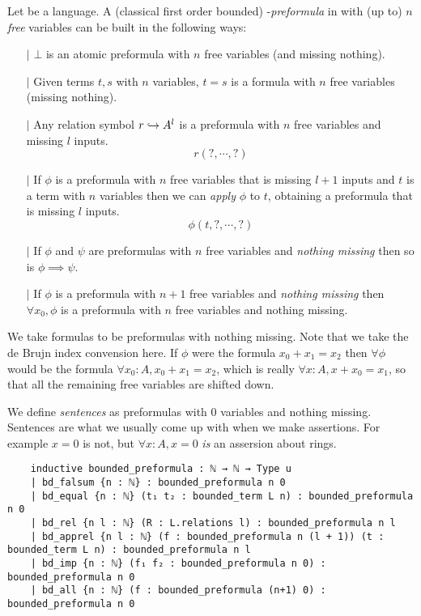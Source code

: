 \begin{dfn}[Formulas]
  Let  be a language.
  A (classical first order bounded) -\textit{preformula} in 
  with (up to) $n$ \textit{free} variables can be built in the following ways:
  \begin{itemize}
    \item[$\vert$] $\bot$ is an atomic preformula with $n$ free variables
          (and missing nothing).
    \item[$\vert$]
          Given terms $t, s$ with $n$ variables,
          $t = s$ is a formula with $n$ free variables (missing nothing).
    \item[$\vert$] Any relation symbol $r \hookrightarrow A^{l}$ is a preformula
          with $n$ free variables and missing $l$ inputs.
          \[ r (?, \cdots, ?)\]
    \item[$\vert$] If $\phi$ is a preformula with $n$ free variables that is missing
          $l + 1$ inputs and $t$ is a term with $n$ variables
          then we can \textit{apply} $\phi$ to $t$, obtaining
          a preformula that is missing $l$ inputs.
          \[ \phi(t , ? , \cdots, ? )\]
    \item[$\vert$] If $\phi$ and $\psi$ are preformulas with $n$ free variables
          and \textit{nothing missing} then so is $\phi \implies \psi$.
    \item[$\vert$] If $\phi$ is a preformula with $n + 1$ free variables
          and \textit{nothing missing} then $\forall x_{0}, \phi$ is a preformula
          with $n$ free variables and nothing missing.
  \end{itemize}

  We take formulas to be preformulas with nothing missing.
  Note that we take the de Brujn index convension here.
  If $\phi$ were the formula $x_{0} + x_{1} = x_{2}$ then $\forall \phi$ would be
  the formula $\forall x_{0} : A, x_{0} + x_{1} = x_{2}$,
  which is really $\forall x : A, x + x_{0} = x_{1}$,
  so that all the remaining free variables are shifted down.

  We define \textit{sentences} as preformulas with $0$ variables and nothing missing.
  Sentences are what we usually come up with when we make assertions.
  For example $x = 0$ is not, but $\forall x : A, x = 0$ \textit{is} an assersion about rings.

  \begin{lstlisting}
    inductive bounded_preformula : ℕ → ℕ → Type u
    | bd_falsum {n : ℕ} : bounded_preformula n 0
    | bd_equal {n : ℕ} (t₁ t₂ : bounded_term L n) : bounded_preformula n 0
    | bd_rel {n l : ℕ} (R : L.relations l) : bounded_preformula n l
    | bd_apprel {n l : ℕ} (f : bounded_preformula n (l + 1)) (t : bounded_term L n) : bounded_preformula n l
    | bd_imp {n : ℕ} (f₁ f₂ : bounded_preformula n 0) : bounded_preformula n 0
    | bd_all {n : ℕ} (f : bounded_preformula (n+1) 0) : bounded_preformula n 0


\end{lstlisting}
\end{dfn}
